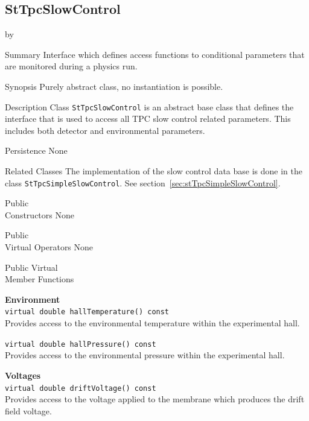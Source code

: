 \documentclass[twoside]{article}
\newcommand{\comp}[1]{\texttt{#1}}%
\newcommand{\entrylabel}[1]{\mbox{\textbf{{#1}}}\hfil}%
\newenvironment{entry}
{\begin{list}{}%
    {\renewcommand{\makelabel}{\entrylabel}%
     \setlength{\labelwidth}{90pt}%
     \setlength{\leftmargin}{\labelwidth}
     \advance\leftmargin by \labelsep%
      }%
    }%
  {\end{list}}
\newcommand{\Entrylabel}[1]%
{\raisebox{0pt}[1ex][0pt]{\makebox[\labelwidth][l]%
    {\parbox[t]{\labelwidth}{\hspace{0pt}\textbf{{#1}}}}}}
\newenvironment{Entry}%
{\renewcommand{\entrylabel}{\Entrylabel}\begin{entry}}%
  {\end{entry}}
\begin{document}
%
%
\subsection{StTpcSlowControl} 
\label{sec:stTpcSlowControl}
\begin{Entry}
\item[Summary]
  Interface which defines access functions to conditional parameters
  that are monitored during a physics run.

\item[Synopsis]
  Purely abstract class, no instantiation is  possible.
  
\item[Description]
Class \comp{StTpcSlowControl} is an abstract base class that defines
the interface that is used to access all TPC slow control related 
parameters.  This includes both detector and environmental 
parameters.

\item[Persistence]
   None

\item[Related Classes]
The implementation of the slow control data base is done in
the class \comp{StTpcSimpleSlowControl}.  See 
section~\ref{sec:stTpcSimpleSlowControl}.

\item[Public \\ Constructors]
   None

\item[Public \\ Virtual Operators]
   None

\item[Public Virtual \\ Member Functions]

  {\bf Environment \\}
  \verb+virtual double hallTemperature() const+\\
  Provides access to the environmental temperature within the experimental 
  hall.
  
  \verb+virtual double hallPressure() const+\\
  Provides access to the environmental pressure within the experimental
  hall.
    
  {\bf Voltages \\}
  \verb+virtual double driftVoltage() const+\\
  Provides access to the voltage applied to the membrane which produces
  the drift field voltage.
    

\end{Entry}
\end{document}
